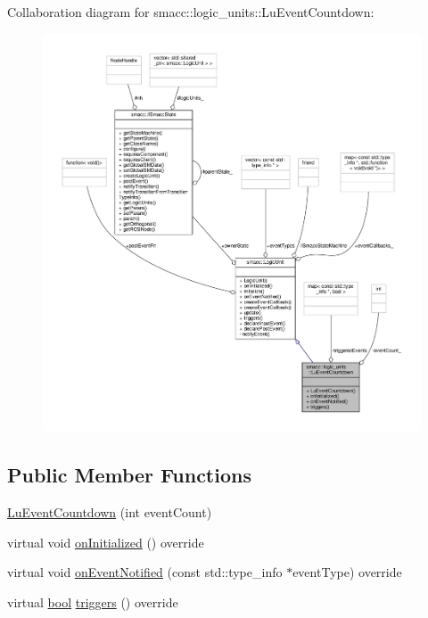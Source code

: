 Collaboration diagram for smacc\+:\+:logic\+\_\+units\+:\+:Lu\+Event\+Countdown\+:\nopagebreak
\begin{figure}[H]
\begin{center}
\leavevmode
\includegraphics[width=350pt]{classsmacc_1_1logic__units_1_1LuEventCountdown__coll__graph}
\end{center}
\end{figure}
\subsection*{Public Member Functions}
\begin{DoxyCompactItemize}
\item 
\hyperlink{classsmacc_1_1logic__units_1_1LuEventCountdown_a50f81b10581e565ba43f1338b4f400b8}{Lu\+Event\+Countdown} (int event\+Count)
\item 
virtual void \hyperlink{classsmacc_1_1logic__units_1_1LuEventCountdown_a8e58411b2e6c2a68fa0218ea7c125a75}{on\+Initialized} () override
\item 
virtual void \hyperlink{classsmacc_1_1logic__units_1_1LuEventCountdown_a9a7b8d4690d21251ad3e12b2bca00620}{on\+Event\+Notified} (const std\+::type\+\_\+info $\ast$event\+Type) override
\item 
virtual \hyperlink{classbool}{bool} \hyperlink{classsmacc_1_1logic__units_1_1LuEventCountdown_a77e004c01a966113e63ded6be7c8ab5d}{triggers} () override
\end{DoxyCompactItemize}
